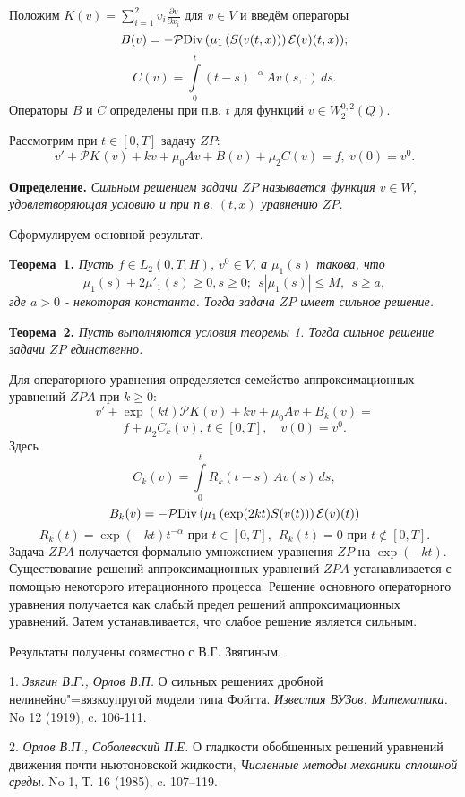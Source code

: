 Положим
$K(v)=\sum_{i=1}^2 v_i\frac{\partial v}{\partial x_i}$ для $v\in V$ и введём операторы
$$
B(v) = - {\mathcal{P}}{\rm Div} \, (\mu_1\,(S(v(t,x)))\,\mathcal{E}(v)(t,x));
$$
$$ C(v)=\int\limits_{0}^t(t-s)^{-\alpha}\,A v(s, \cdot )\,ds.
$$
Операторы $B$ и
$C$ определены при п.в. $t$ для функций $v\in W_2^{0,2}(Q)$.

Рассмотрим при $ t\in[0,T]$ задачу $ZP$:
$$
v'+\mathcal{P}K_{}( v)+ k v+\mu_0 Av +B(v)+\mu_2C(v)= f,\ v(0)=v^0.
$$


\textbf{Определение.} {\it
Сильным решением задачи $ZP$ называется функция $v\in W$, удовлетворяющая условию и при п.в. $(t,x)$ уравнению $ZP$.}

Сформулируем основной результат.

\textbf{Теорема~1.} {\it Пусть $f\in L_2 (0,T;H)$, $v^0\in V$, а $\mu_1(s)$ такова, что
$$
 \mu_1(s)+2\mu'_1(s)\ge 0, s\ge 0; \ \ s|\mu_1(s)|\le M,\ \ s\ge a,
$$
где $a>0$ - некоторая константа. Тогда задача $ZP$ имеет сильное решение.}


\textbf{Теорема~2.} {\it Пусть выполняются условия теоремы 1.
Тогда сильное решение задачи $ZP$ единственно.}

 Для операторного уравнения
определяется семейство аппроксимационных уравнений $ZPA$ при $k\ge 0$:
$$
v'+\exp(kt)\mathcal{P}K(v)+ k v+\mu_0 Av +B_k(v)=
$$
$$
f+\mu_2 C_k(v),\, t\in[0,T], \quad v(0)=v^0.
$$
Здесь
$$
C_k(v)=\int\limits_{0}^tR_k(t-s)\,A v(s)\,ds,
$$
$$
B_k(v) = - {\mathcal{P}}{\rm Div} \, (\mu_1\,(\exp(2kt)S(v(t)))\,\mathcal{E}(v)(t))
$$
$$
R_k(t)=\exp(-kt)t^{-\alpha} \mbox{ при } t\in[0,T],\ \ R_k(t)=0 \mbox{ при } t\notin[0,T].
$$
 Задача $ZPA$ получается формально умножением уравнения $ZP$ на $\exp(-kt)$.
 Существование
решений аппроксимационных уравнений $ZPA$ устанавливается с помощью
некоторого итерационного процесса. Решение основного операторного уравнения получается как
слабый предел решений аппроксимационных уравнений. Затем устанавливается, что слабое решение является сильным.




Результаты получены совместно с В.Г. Звягиным.



\litlist

1. {\it Звягин В.Г., Орлов В.П.} О сильных решениях дробной нелинейно"=вязкоупругой модели типа Фойгта. {\it Известия \newline ВУЗов. Математика.} No 12 (1919), c. 106-111.

2. {\it Орлов В.П., Соболевский П.Е.} О гладкости обоб\-щен\-ных решений уравнений движения почти ньютоновской \newline жидкости, {\it Численные методы механики сплошной среды}. \newline No 1, Т. 16 (1985), c. 107--119.
